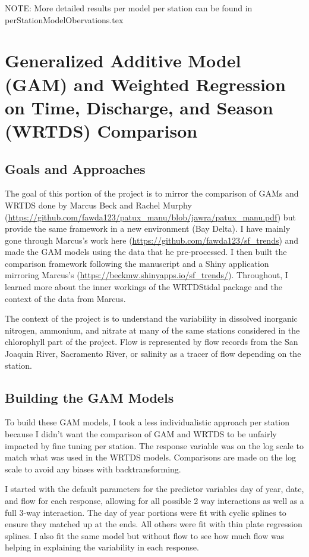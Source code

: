 \documentclass[12pt]{amsart}
\begin{document}
NOTE: More detailed results per model per station can be found in perStationModelObervations.tex

\section{Generalized Additive Model (GAM) and Weighted Regression on Time, Discharge, and Season (WRTDS) Comparison}

\subsection{Goals and Approaches}
The goal of this portion of the project is to mirror the comparison of GAMs and WRTDS done by Marcus Beck and Rachel Murphy (\url{https://github.com/fawda123/patux_manu/blob/jawra/patux_manu.pdf}) but provide the same framework in a new environment (Bay Delta). I have mainly gone through Marcus's work here (\url{https://github.com/fawda123/sf_trends}) and made the GAM models using the data that he pre-processed. I then built the comparison framework following the manuscript and a Shiny application mirroring Marcus's (\url{https://beckmw.shinyapps.io/sf_trends/}). Throughout, I learned more about the inner workings of the WRTDStidal package and the context of the data from Marcus.

The context of the project is to understand the variability in dissolved inorganic nitrogen, ammonium, and nitrate at many of the same stations considered in the chlorophyll part of the project. Flow is represented by flow records from the San Joaquin River, Sacramento River, or salinity as a tracer of flow depending on the station.

\subsection{Building the GAM Models}

To build these GAM models, I took a less individualistic approach per station because I didn't want the comparison of GAM and WRTDS to be unfairly impacted by fine tuning per station. The response variable was on the log scale to match what was used in the WRTDS models. Comparisons are made on the log scale to avoid any biases with backtransforming.

I started with the default parameters for the predictor variables day of year, date, and flow for each response, allowing for all possible 2 way interactions as well as a full 3-way interaction. The day of year portions were fit with cyclic splines to ensure they matched up at the ends. All others were fit with thin plate regression splines. I also fit the same model but without flow to see how much flow was helping in explaining the variability in each response. 
\end{document}
